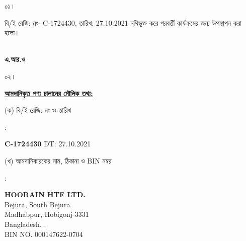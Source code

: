 \documentclass[12pt]{article}
\newcommand{\beno}{C-1724430}
\newcommand{\bedt}{27.10.2021}
\newcommand{\htf}{HOORAIN HTF LTD.}
\newcommand{\htfa}{Bejura, South Bejura
\\
Madhabpur, Hobigonj-3331
\\
Bangladesh.
.}
\newcommand{\impn}{\htf}
\newcommand{\impadd}{\htfa}
\newcommand{\impbin}{000147622-0704}
\begin{document}
\noindent
\begin{minipage}[t]{0.05\linewidth}
০১।
\end{minipage}
\begin{minipage}[t]{0.95\linewidth}
বি/ই রেজি: নং- {\beno}, তারিখ: {\bedt}
নথিভূক্ত করে পরবর্তী কার্যক্রমের জন্য উপস্থাপন করা হলো।
\\
\\
\end{minipage}
\begin{minipage}[t]{0.05\linewidth}
\hspace*{1em}
\end{minipage}
\begin{minipage}[t]{0.45\linewidth}
\hspace*{1em}
\end{minipage}
\begin{minipage}[t]{0.50\linewidth}
\textbf{এ.আর.ও}
\end{minipage}
\begin{minipage}[t]{0.05\linewidth}
০২।
\end{minipage}
\begin{minipage}[t]{0.95\linewidth}
\underline{\textbf {আমদানিকৃত পণ্য চালানের
মৌলিক তথ্য:}}
\\
\end{minipage}
\footnotesize
\begin{minipage}[t]{0.05\linewidth}
\hspace*{1em}
\end{minipage}
\begin{minipage}[t]{0.45\linewidth}
(ক) বি/ই রেজি: নং ও তারিখ
\end{minipage}
\begin{minipage}[t]{0.02\linewidth}
:
\end{minipage}
\begin{minipage}[t]{0.50\linewidth}
\textbf{{\beno}} \hspace{2em} DT: {\bedt}
\\
\end{minipage}
\begin{minipage}[t]{0.05\linewidth}
\hspace*{1em}
\end{minipage}
\begin{minipage}[t]{0.45\linewidth}
(খ) আমদানিকারকের নাম, ঠিকানা
ও BIN নম্বর
\end{minipage}
\begin{minipage}[t]{0.02\linewidth}
:
\end{minipage}
\begin{minipage}[t]{0.50\linewidth}
\textbf{{\impn}}
\\
{\impadd}
\\
BIN NO. {\impbin}
\\
\end{minipage}
\end{document}
